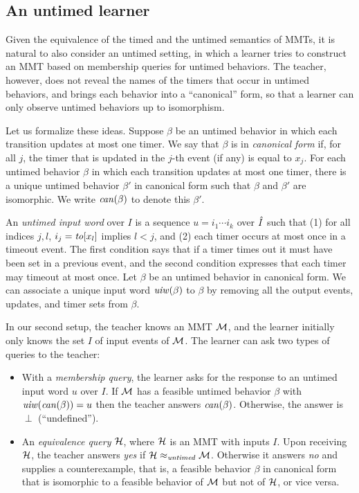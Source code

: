\subsection{An untimed learner}
Given the equivalence of the timed and the untimed semantics of MMTs, it is natural to also 
consider an untimed setting, in which a learner tries to construct an MMT based on membership queries for untimed behaviors.
The teacher, however, does not reveal the names of the timers that occur in untimed behaviors, and brings each behavior into a
``canonical'' form, so that a learner can only observe untimed behaviors up to isomorphism.

Let us formalize these ideas.
Suppose $\beta$ be an untimed behavior in which each transition updates at most one timer.
We say that $\beta$ is in \emph{canonical form} if, for all $j$, the timer that is updated in the $j$-th event
(if any) is equal to $x_j$.
For each untimed behavior $\beta$ in which each transition updates at most one timer, there is a unique untimed behavior
$\beta'$ in canonical form such that $\beta$ and $\beta'$ are isomorphic.
We write $\mathit{can}({\beta})$ to denote this $\beta'$.

An \emph{untimed input word} over $I$ is a sequence $u = i_1 \cdots i_k$ over $\hat{I}$ such that (1)
for all indices $j, l$, $i_j = \mathit{to}[x_l]$ implies $l < j$, and (2) each timer occurs at most once in a timeout event.
The first condition  says that if a timer times out it must have been set in a previous event, and the second condition  expresses that
each timer may timeout at most once.
Let $\beta$ be an untimed behavior in canonical form.
We can associate a unique input word $\mathit{uiw}(\beta)$ to $\beta$ by removing all the output events,
updates, and timer sets from $\beta$.

In our second setup, the teacher knows an MMT ${\cal M}$,
and the learner initially only knows the set $I$ of input events of ${\cal M}$.
The learner can ask two types of queries to the teacher:
\begin{itemize}
\item
With a \emph{membership query}, the learner asks for the response to an untimed input word $u$ over $I$.
If ${\cal M}$ has a feasible untimed behavior $\beta$ with $\mathit{uiw}(\mathit{can}({\beta})) = u$ then the teacher answers
$\mathit{can}({\beta})$. Otherwise, the answer is $\perp$ (``undefined'').
\item
An \emph{equivalence query} ${\cal H}$, where ${\cal H}$ is an MMT with inputs $I$.
Upon receiving ${\cal H}$, the teacher answers \emph{yes} if ${\cal H} \approx_{\mathit{untimed}} {\cal M}$.
Otherwise it answers \emph{no} and supplies a counterexample, that is, a feasible behavior $\beta$ in canonical form that
is isomorphic to a feasible behavior of ${\cal M}$ but not of ${\cal H}$, or vice versa.
\end{itemize}

